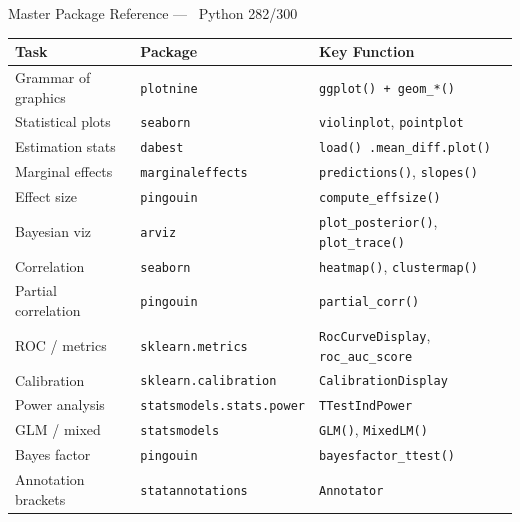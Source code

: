 \documentclass[10pt]{beamer}
\newcommand{\Python}{\textcolor{PyAccent}{\faPython~Python}}
\newcommand{\smark}[1]{\hfill{\scriptsize\color{codegray}#1}}
\begin{document}
\begin{frame}{Master Package Reference --- \Python}
\smark{282/300}
\centering\scriptsize
\begin{tabular}{@{}lll@{}}
    \toprule
    \textbf{Task} & \textbf{Package} & \textbf{Key Function} \\
    \midrule
    Grammar of graphics  & \texttt{plotnine}       & \texttt{ggplot() + geom\_*()} \\
    Statistical plots     & \texttt{seaborn}        & \texttt{violinplot}, \texttt{pointplot} \\
    Estimation stats     & \texttt{dabest}         & \texttt{load() .mean\_diff.plot()} \\
    Marginal effects     & \texttt{marginaleffects}& \texttt{predictions()}, \texttt{slopes()} \\
    Effect size          & \texttt{pingouin}       & \texttt{compute\_effsize()} \\
    Bayesian viz         & \texttt{arviz}          & \texttt{plot\_posterior()}, \texttt{plot\_trace()} \\
    Correlation          & \texttt{seaborn}        & \texttt{heatmap()}, \texttt{clustermap()} \\
    Partial correlation  & \texttt{pingouin}       & \texttt{partial\_corr()} \\
    ROC / metrics        & \texttt{sklearn.metrics}& \texttt{RocCurveDisplay}, \texttt{roc\_auc\_score} \\
    Calibration          & \texttt{sklearn.calibration}& \texttt{CalibrationDisplay} \\
    Power analysis       & \texttt{statsmodels.stats.power}& \texttt{TTestIndPower} \\
    GLM / mixed          & \texttt{statsmodels}    & \texttt{GLM()}, \texttt{MixedLM()} \\
    Bayes factor         & \texttt{pingouin}       & \texttt{bayesfactor\_ttest()} \\
    Annotation brackets  & \texttt{statannotations}& \texttt{Annotator} \\
    \bottomrule
\end{tabular}
\end{frame}
\end{document}
